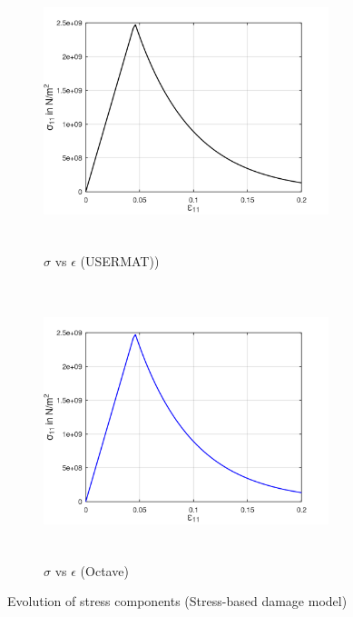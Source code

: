 \documentclass[12pt,a4paper,twoside,openright]{report}
\begin{document}
\begin{figure}[htbp!]
     \captionsetup[subfigure]{justification=centering}
     \begin{subfigure}{0.4\textwidth}
         \includegraphics[width=8.3cm,height=8cm,keepaspectratio]{22.StressvsStrain_Ansys.png}
         \caption{$\sigma$ vs $\epsilon$ (USERMAT))}
         \label{fig:Stress-Strain relation in Ansys2}
     \end{subfigure}
     \hspace{1.8cm}
     \begin{subfigure}{0.4\textwidth}
          \includegraphics[width=8.3cm,height=8cm,keepaspectratio]{22.StressvsStrain_Octave.png}
         \caption{$\sigma$ vs $\epsilon$ (Octave)}
         \label{fig:Stress-Strain relation Octave2}
     \end{subfigure}
     \caption{Evolution of stress components (Stress-based damage model)}

\end{figure}
\FloatBarrier
\end{document}
